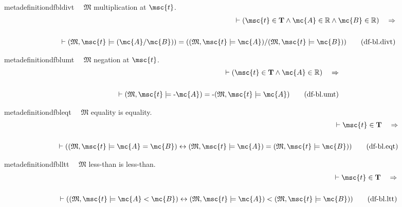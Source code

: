 \begin{restatable}{metadefinition}{dfbldivt}~~ $\mathfrak{M}$ multiplication at
$\msc{t}$.
\begin{align}
\vdash ( \msc{t} \in \mathbf{T} \wedge \mc{A} \in \mathbb{R} \wedge \mc{B} \in
    \mathbb{R} )\quad\Rightarrow \notag \\ 
	 \notag \\ 
	\quad \vdash ( \mathfrak{M} , \msc{t} \models (
    \mc{A} / \mc{B} ) ) = ( ( \mathfrak{M} , \msc{t} \models \mc{A} ) / (
    \mathfrak{M} , \msc{t} \models \mc{B} )
    )\label{eq:df-bl.divt}\tag{df-bl.divt}
\end{align}
\end{restatable}

\begin{restatable}{metadefinition}{dfblumt}~~ $\mathfrak{M}$ negation at $\msc{t}$.
\begin{align}
\vdash ( \msc{t} \in \mathbf{T} \wedge \mc{A} \in \mathbb{R}
    )\quad\Rightarrow \notag \\ 
	 \notag \\ 
	\quad \vdash ( \mathfrak{M} , \msc{t} \models \textrm{-}
    \mc{A} ) = \textrm{-} ( \mathfrak{M} , \msc{t} \models \mc{A}
    )\label{eq:df-bl.umt}\tag{df-bl.umt}
\end{align}
\end{restatable}

\begin{restatable}{metadefinition}{dfbleqt}~~ $\mathfrak{M}$ equality is equality.
\begin{align}
\vdash \msc{t} \in \mathbf{T}\quad\Rightarrow \notag \\ 
	 \notag \\ 
	\quad \vdash ( ( \mathfrak{M} ,
    \msc{t} \models \mc{A} = \mc{B} ) \leftrightarrow ( \mathfrak{M} , \msc{t}
    \models \mc{A} ) = ( \mathfrak{M} , \msc{t} \models \mc{B} )
    )\label{eq:df-bl.eqt}\tag{df-bl.eqt}
\end{align}
\end{restatable}

\begin{restatable}{metadefinition}{dfblltt}~~ $\mathfrak{M}$ less-than is less-than.
\begin{align}
\vdash \msc{t} \in \mathbf{T}\quad\Rightarrow \notag \\ 
	 \notag \\ 
	\quad \vdash ( ( \mathfrak{M} ,
    \msc{t} \models \mc{A} < \mc{B} ) \leftrightarrow ( \mathfrak{M} , \msc{t}
    \models \mc{A} ) < ( \mathfrak{M} , \msc{t} \models \mc{B} )
    )\label{eq:df-bl.ltt}\tag{df-bl.ltt}
\end{align}
\end{restatable}

